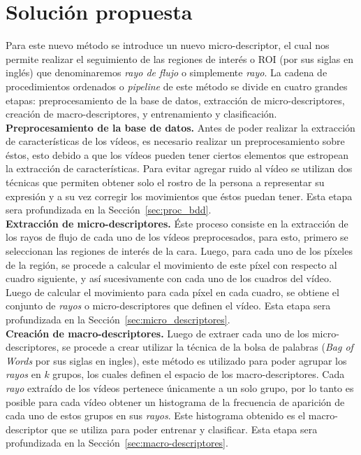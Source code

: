 \section{Solución propuesta}
\label{sec:solucion}

Para este nuevo método se introduce un nuevo micro-descriptor, el cual nos permite realizar el seguimiento de las regiones de interés o ROI (por sus siglas en inglés) que denominaremos \textit{rayo de flujo} o simplemente \textit{rayo}.
La cadena de procedimientos ordenados o \textit{pipeline} de este método se divide en cuatro grandes etapas: preprocesamiento de la base de datos, extracción de micro-descriptores, creación de macro-descriptores, y entrenamiento y clasificación.\\


\textbf{Preprocesamiento de la base de datos.}
Antes de poder realizar la extracción de características de los vídeos, es necesario realizar un preprocesamiento sobre éstos, esto debido a que los vídeos pueden tener ciertos elementos que estropean la extracción de características. Para evitar agregar ruido al vídeo se utilizan dos técnicas que permiten obtener solo el rostro de la persona a representar su expresión y a su vez corregir los movimientos que éstos puedan tener. Esta etapa sera profundizada en la Sección~\ref{sec:proc_bdd}.\\


\textbf{Extracción de micro-descriptores.}
Éste proceso consiste en la extracción de los rayos de flujo de cada uno de los vídeos preprocesados, para esto, primero se seleccionan las regiones de interés de la cara. Luego, para cada uno de los píxeles de la región, se procede a calcular el movimiento de este píxel con respecto al cuadro siguiente, y así sucesivamente con cada uno de los cuadros del vídeo. Luego de calcular el movimiento para cada píxel en cada cuadro, se obtiene el conjunto de \textit{rayos} o micro-descriptores que definen el vídeo. Esta etapa sera profundizada en la Sección~\ref{sec:micro_descriptores}.\\


\textbf{Creación de macro-descriptores.}
Luego de extraer cada uno de los micro-descriptores, se procede a crear utilizar la técnica de la bolsa de palabras (\textit{Bag of Words} por sus siglas en ingles), este método es utilizado para poder agrupar los \textit{rayos} en $k$ grupos, los cuales definen el espacio de los macro-descriptores. Cada \textit{rayo} extraído de los vídeos pertenece únicamente a un solo grupo, por lo tanto es posible para cada vídeo obtener un histograma de la frecuencia de aparición de cada uno de estos grupos en sus \textit{rayos}. Este histograma obtenido es el macro-descriptor que se utiliza para poder entrenar y clasificar. Esta etapa sera profundizada en la Sección~\ref{sec:macro-descriptores}.\\


